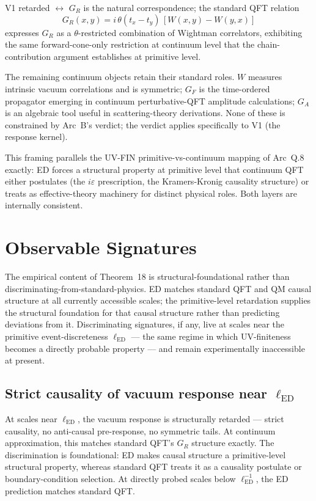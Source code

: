 \documentclass[11pt,a4paper]{article}
\begin{document}
V1 retarded $\leftrightarrow$ $G_R$ is the natural correspondence; the standard QFT relation
\[
G_R(x, y) = i\,\theta(t_x - t_y)\,[W(x, y) - W(y, x)]
\]
expresses $G_R$ as a $\theta$-restricted combination of Wightman correlators, exhibiting the same forward-cone-only restriction at continuum level that the chain-contribution argument establishes at primitive level.

The remaining continuum objects retain their standard roles. $W$ measures intrinsic vacuum correlations and is symmetric; $G_F$ is the time-ordered propagator emerging in continuum perturbative-QFT amplitude calculations; $G_A$ is an algebraic tool useful in scattering-theory derivations. None of these is constrained by Arc~B's verdict; the verdict applies specifically to V1 (the response kernel).

This framing parallels the UV-FIN primitive-vs-continuum mapping of Arc~Q.8 exactly: ED forces a structural property at primitive level that continuum QFT either postulates (the $i\varepsilon$ prescription, the Kramers-Kronig causality structure) or treats as effective-theory machinery for distinct physical roles. Both layers are internally consistent.

\section{Observable Signatures}

The empirical content of Theorem~18 is structural-foundational rather than discriminating-from-standard-physics. ED matches standard QFT and QM causal structure at all currently accessible scales; the primitive-level retardation supplies the structural foundation for that causal structure rather than predicting deviations from it. Discriminating signatures, if any, live at scales near the primitive event-discreteness $\ell_\mathrm{ED}$ --- the same regime in which UV-finiteness becomes a directly probable property --- and remain experimentally inaccessible at present.

\subsection{Strict causality of vacuum response near $\ell_\mathrm{ED}$}

At scales near $\ell_\mathrm{ED}$, the vacuum response is structurally retarded --- strict causality, no anti-causal pre-response, no symmetric tails. At continuum approximation, this matches standard QFT's $G_R$ structure exactly. The discrimination is foundational: ED makes causal structure a primitive-level structural property, whereas standard QFT treats it as a causality postulate or boundary-condition selection. At directly probed scales below $\ell_\mathrm{ED}^{-1}$, the ED prediction matches standard QFT.
\end{document}
